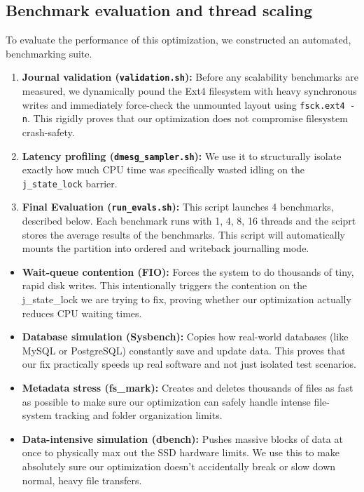 \documentclass[12pt,a4paper]{article}
\begin{document}
\subsection{Benchmark evaluation and thread scaling}

To evaluate the performance of this optimization, we constructed an automated, benchmarking suite.

\begin{enumerate}[leftmargin=*]
  \item \textbf{Journal validation (\texttt{validation.sh}):} Before any scalability benchmarks are measured, we dynamically pound the Ext4 filesystem with heavy synchronous writes and immediately force-check the unmounted layout using \texttt{fsck.ext4 -n}. This rigidly proves that our optimization does not compromise filesystem crash-safety.
  
  \item \textbf{Latency profiling (\texttt{dmesg\_sampler.sh}):} We use it to structurally isolate exactly how much CPU time was specifically wasted idling on the \texttt{j\_state\_lock} barrier.
  
  \item \textbf{Final Evaluation (\texttt{run\_evals.sh}):} This script launches 4 benchmarks, described below. Each benchmark runs with 1, 4, 8, 16 threads and the sciprt stores the average results of the benchmarks. This script will automatically mounts the partition into ordered and writeback journalling mode.
\end{enumerate}



\begin{itemize}[leftmargin=*]
  \item \textbf{Wait-queue contention (FIO):} Forces the system to do thousands of tiny, rapid disk writes. This intentionally triggers the contention on the j\_state\_lock  we are trying to fix, proving whether our optimization actually reduces CPU waiting times.
  
  \item \textbf{Database simulation (Sysbench):} Copies how real-world databases (like MySQL or PostgreSQL) constantly save and update data. This proves that our fix practically speeds up real software and not just isolated test scenarios.
  
  \item \textbf{Metadata stress (fs\_mark):} Creates and deletes thousands of files as fast as possible to make sure our optimization can safely handle intense file-system tracking and folder organization limits.
  
  \item \textbf{Data-intensive simulation (dbench):} Pushes massive blocks of data at once to physically max out the SSD hardware limits. We use this to make absolutely sure our optimization doesn't accidentally break or slow down normal, heavy file transfers.
\end{itemize}
\end{document}
